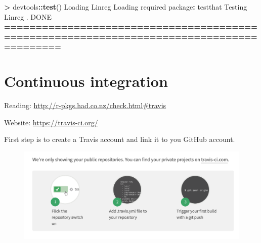 \documentclass[]{book}
\newenvironment{Shaded}{\begin{snugshade}}{\end{snugshade}}
\newcommand{\KeywordTok}[1]{\textcolor[rgb]{0.13,0.29,0.53}{\textbf{#1}}}
\newcommand{\DataTypeTok}[1]{\textcolor[rgb]{0.13,0.29,0.53}{#1}}
\newcommand{\DecValTok}[1]{\textcolor[rgb]{0.00,0.00,0.81}{#1}}
\newcommand{\StringTok}[1]{\textcolor[rgb]{0.31,0.60,0.02}{#1}}
\newcommand{\OperatorTok}[1]{\textcolor[rgb]{0.81,0.36,0.00}{\textbf{#1}}}
\newcommand{\ErrorTok}[1]{\textcolor[rgb]{0.64,0.00,0.00}{\textbf{#1}}}
\newcommand{\NormalTok}[1]{#1}
\theoremstyle{definition}
\theoremstyle{definition}
\theoremstyle{definition}
\theoremstyle{remark}
\begin{document}
\begin{Shaded}
\end{Shaded}

\begin{Shaded}
\begin{Highlighting}[]
\OperatorTok{>}\StringTok{ }\NormalTok{devtools}\OperatorTok{::}\KeywordTok{test}\NormalTok{()}
\NormalTok{Loading Linreg}
\NormalTok{Loading required package}\OperatorTok{:}\StringTok{ }\NormalTok{testthat}
\NormalTok{Testing Linreg}
\NormalTok{.}
\NormalTok{DONE }\OperatorTok{==}\ErrorTok{=======================================================================================}
\end{Highlighting}
\end{Shaded}

\section{Continuous integration}\label{continuous-integration}

Reading: \url{http://r-pkgs.had.co.nz/check.html\#travis}

Website: \url{https://travis-ci.org/}

First step is to create a Travis account and link it to you GitHub
account.

\begin{figure}

{\centering \includegraphics{images/ch3_travis_github} 

}

\end{figure}
\end{document}
